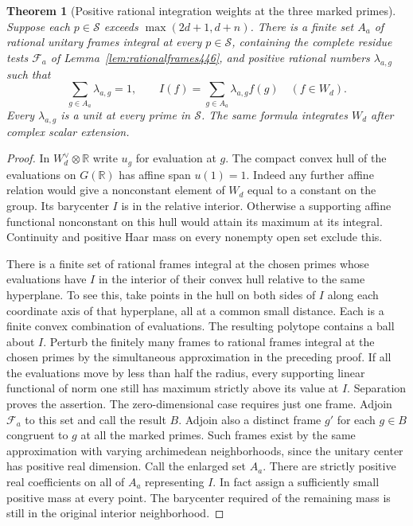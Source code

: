\documentclass[a4paper,11pt]{article}
\newtheorem{theorem}[proposition]{Theorem}
\theoremstyle{definition}
\theoremstyle{remark}
\numberwithin{equation}{section}
\begin{document}
\begin{theorem}[Positive rational integration weights at the three marked primes]\leavevmode
\label{thm:compactquadrature447}
Suppose each \(p\in\mathcal S\) exceeds \(\max(2d+1,d+n)\).
There is a finite set \(A_a\) of rational unitary frames integral
at every \(p\in\mathcal S\), containing the complete residue tests
\(\mathcal F_a\) of Lemma~\ref{lem:rationalframes446}, and positive
rational numbers \(\lambda_{a,g}\) such that
\[
       \sum_{g\in A_a}\lambda_{a,g}=1,\qquad
       I(f)=\sum_{g\in A_a}\lambda_{a,g} f(g)\quad(f\in W_d).
\]
Every \(\lambda_{a,g}\) is a unit at every prime in \(\mathcal S\).
The same formula integrates \(W_d\) after complex scalar extension.
\end{theorem}
\begin{proof}
In \(W_d^\vee\otimes\mathbb R\) write \(u_g\) for evaluation at
\(g\). The compact convex hull of the evaluations on \(G(\mathbb R)\)
has affine span \(u(1)=1\). Indeed any further affine relation
would give a nonconstant element of \(W_d\) equal to a constant
on the group. Its barycenter \(I\) is in the relative interior.
Otherwise a supporting affine functional nonconstant on this hull
would attain its maximum at its integral. Continuity and positive
Haar mass on every nonempty open set exclude this.

There is a finite set of rational frames integral at the chosen primes
whose evaluations have \(I\) in the interior of their convex hull
relative to the same hyperplane. To see this, take points in the hull
on both sides of \(I\) along each coordinate axis of that hyperplane,
all at a common small distance. Each is a finite convex combination of
evaluations. The resulting polytope contains a ball about \(I\).
Perturb the finitely many frames to rational frames integral at the
chosen primes by the simultaneous approximation in the preceding
proof. If all the evaluations move by less than half the radius,
every supporting linear functional of norm one still has maximum
strictly above its value at \(I\). Separation proves the assertion.
The zero-dimensional case requires just one frame.
Adjoin \(\mathcal F_a\) to this set and call the result \(B\).
Adjoin also a distinct frame \(g'\) for each \(g\in B\) congruent
to \(g\) at all the marked primes. Such frames exist by the
same approximation with varying archimedean neighborhoods, since
the unitary center has positive real dimension. Call the enlarged
set \(A_a\). There are strictly positive real coefficients on all
of \(A_a\) representing \(I\). In fact assign a sufficiently small
positive mass at every point. The barycenter required of the
remaining mass is still in the original interior neighborhood.


\end{proof}
\end{document}
